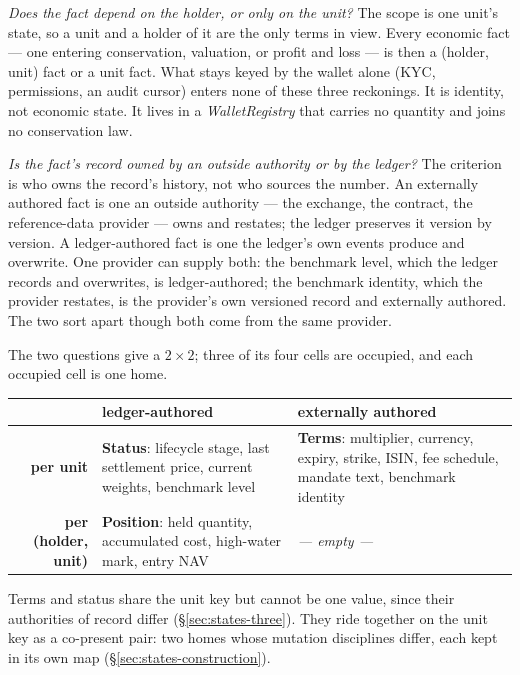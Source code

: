 \emph{Does the fact depend on the holder, or only on the unit?} The scope is one unit's
state, so a unit and a holder of it are the only terms in view. Every economic fact ---
one entering conservation, valuation, or profit and loss --- is then a (holder, unit)
fact or a unit fact. What stays keyed by the wallet alone (KYC, permissions, an audit
cursor) enters none of these three reckonings. It is identity, not economic state. It
lives in a \emph{WalletRegistry} that carries no quantity and joins no conservation law.

\emph{Is the fact's record owned by an outside authority or by the ledger?} The criterion
is who owns the record's history, not who sources the number. An externally authored fact
is one an outside authority --- the exchange, the contract, the reference-data provider
--- owns and restates; the ledger preserves it version by version. A ledger-authored
fact is one the ledger's own events produce and overwrite. One provider can supply both:
the benchmark level, which the ledger records and overwrites, is ledger-authored; the
benchmark identity, which the provider restates, is the provider's own versioned record
and externally authored. The two sort apart though both come from the same provider.

The two questions give a $2\times2$; three of its four cells are occupied, and each
occupied cell is one home.

\begin{center}
\begin{tabular}{@{}r p{} p{}@{}}
\toprule
 & \textbf{ledger-authored} & \textbf{externally authored} \\
\midrule
\textbf{per unit} & \textbf{Status}: lifecycle stage, last settlement price, current
weights, benchmark level & \textbf{Terms}: multiplier, currency, expiry, strike, ISIN,
fee schedule, mandate text, benchmark identity \\
\addlinespace
\textbf{per (holder, unit)} & \textbf{Position}: held quantity, accumulated cost,
high-water mark, entry NAV & \textit{--- empty ---} \\
\bottomrule
\end{tabular}
\end{center}

Terms and status share the unit key but cannot be one value, since their authorities of
record differ (\S\ref{sec:states-three}). They ride together on the unit key as a
co-present pair: two homes whose mutation disciplines differ, each kept in its own map
(\S\ref{sec:states-construction}).

